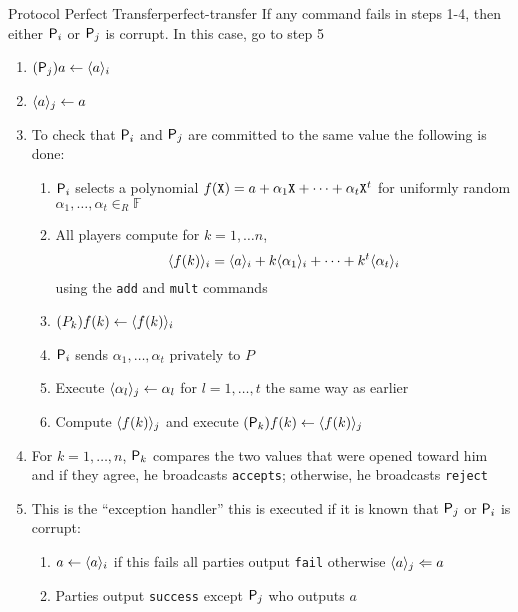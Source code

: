 \begin{protocol}{Protocol Perfect Transfer}{perfect-transfer}
  If any command fails in steps 1-4, then either $\P_i$ or $\P_j$ is corrupt. In this case, go to step 5
  \begin{enumerate}
    \item $(\P_j)a \leftarrow \commit{a}{i}$
    \item $\commit{a}{j} \leftarrow a$
    \item To check that $\P_i$ and $\P_j$ are committed to the same value the following is done:
    \begin{enumerate}
    	\item $\P_i$ selects a polynomial $f(\X) = a + \alpha_1 \X + \cdots + \alpha_t \X^t$ for uniformly random $\alpha_1, \dots, \alpha_t \in_R \mathbb F$ 
      \item All players compute for $k=1, \dots n$,
      \[
        \commit{f(k)}{i} = \commit{a}{i} + k \commit{\alpha_1}{i} + \cdots + k^t \commit{\alpha_t}{i}
      \]
      using the \texttt{add} and \texttt{mult} commands
      \item  $(P_k)f(k) \leftarrow \commit{f(k)}{i}$
      \item $\P_i$ sends $\alpha_1, \dots, \alpha_t$ privately to $P$ 
      \item Execute $\commit{\alpha_l}{j} \leftarrow \alpha_l$ for $l=1,\dots,t$ the same way as earlier
      \item Compute $\commit{f(k)}{j}$ and execute $(\P_k)f(k) \leftarrow \commit{f(k)}{j}$
    \end{enumerate}
    \item For $k=1, \dots,n$, $\P_k$ compares the two values that were opened toward him and if they agree, he broadcasts \texttt{accepts}; otherwise, he broadcasts \texttt{reject}
    \item This is the ``exception handler'' this is executed if it is known that $\P_j$ or $\P_i$ is corrupt:
    \begin{enumerate}
    	\item $a \leftarrow \commit{a}{i}$ if this fails all parties output \texttt{fail} otherwise $\commit{a}{j} \Leftarrow a$ 
      \item Parties output \texttt{success} except $\P_j$ who outputs $a$
    \end{enumerate}
  \end{enumerate}
\end{protocol}

